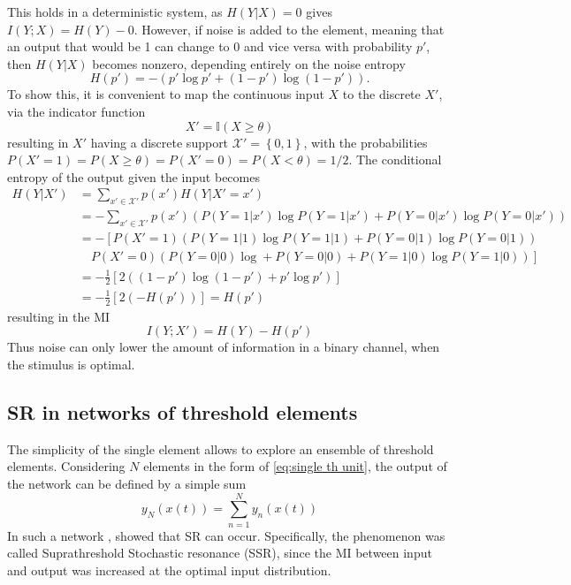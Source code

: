 This holds in a deterministic system, as $H(Y|X) = 0$ gives $I(Y;X) = H(Y) - 0$. 
However, if noise is added to the element, meaning that an output that would be 1 can change to 0 and vice versa with probability $p'$, then $H(Y|X)$ becomes nonzero, depending entirely on the noise entropy
\begin{equation}
    H(p') = -\left(p'\log p' +(1-p')\log (1-p')\right) \text{.}
\end{equation}
To show this, it is convenient to map the continuous input $X$ to the discrete $X'$, via the indicator function
\begin{equation}
    X' = \mathbb{I}\left(X\geq \theta\right)
\end{equation}
resulting in $X'$ having a discrete support $\mathcal{X'}=\left\{0,1\right\}$, with the probabilities $P(X'=1)=P(X\geq \theta) = P(X'=0)=P(X<\theta)=1/2$.
The conditional entropy of the output given the input becomes
\begin{align*}
    H(Y|X') &= \sum_{x'\in \mathcal{X'}} p(x') H(Y|X'=x')\\
    &= -\sum_{x' \in \mathcal{X'}} p(x')\left(P\left(Y=1|x'\right)\log P(Y=1|x') + P\left(Y=0|x'\right)\log P\left(Y=0|x'\right)\right)\\
    &= -\left[P(X'=1)\left(P\left(Y=1|1\right)\log P(Y=1|1) + P\left(Y=0|1\right)\log P\left(Y=0|1\right)\right)\right.\\ 
    &\quad\left.P\left(X'=0\right)\left(P\left(Y=0|0\right)\log + P\left(Y=0|0\right)+P\left(Y=1|0\right)\log P(Y=1|0)\right)\right]\\
    &= -\frac{1}{2}\left[2\left((1-p')\log (1-p') + p'\log p'\right)\right]\\
    &= -\frac{1}{2}\left[2\left(-H(p')\right)\right] = H(p')
\end{align*}
resulting in the MI
\begin{equation}
    I(Y;X') = H(Y) - H(p')
\end{equation}
Thus noise can only lower the amount of information in a binary channel, when the stimulus is optimal.

\subsection{SR in networks of threshold elements}
The simplicity of the single element allows to explore an ensemble of threshold elements. 
Considering $N$ elements in the form of \ref{eq:single th unit}, the output of the network can be defined by a simple sum
\begin{equation}
    y_N(x(t)) = \sum_{n=1}^{N} y_n(x(t))
\end{equation}
In such a network \textcite{stocksSuprathresholdStochasticResonance2000,stocksInformationTransmissionParallel2001}, showed that SR can occur. 
Specifically, the phenomenon was called Suprathreshold Stochastic resonance (SSR), since the MI between input and output was increased at the optimal input distribution.

